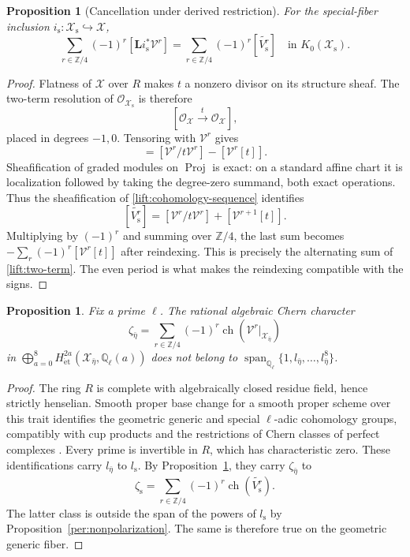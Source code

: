 \documentclass[11pt]{article}
\newtheorem{proposition}[theorem]{Proposition}
\theoremstyle{definition}
\theoremstyle{remark}
\newcommand{\Q}{\mathbb Q}
\newcommand{\Z}{\mathbb Z}
\DeclareMathOperator{\Proj}{Proj}
\DeclareMathOperator{\ch}{ch}
\newcommand{\cO}{\mathcal O}
\numberwithin{equation}{section}
\begin{document}
\begin{proposition}[Cancellation under derived restriction]
\label{lift:cancellation}
For the special-fiber inclusion $i_{\mathrm s}:\mathscr X_{\mathrm s}
\hookrightarrow\mathscr X$,
\begin{equation}
 \sum_{r\in\Z/4}(-1)^r
       [\mathbf L i_{\mathrm s}^*\mathcal V^r]
 =\sum_{r\in\Z/4}(-1)^r[\widetilde{V_{\mathrm s}^r}]
 \quad\text{in }K_0(\mathscr X_{\mathrm s}).
 \label{lift:derived-equality}
\end{equation}
\end{proposition}

\begin{proof}
Flatness of $\mathscr X$ over $R$ makes $t$ a nonzero divisor on its
structure sheaf.  The two-term resolution of
$\cO_{\mathscr X_{\mathrm s}}$ is therefore
\[
 [\cO_{\mathscr X}\xrightarrow{\ t\ }\cO_{\mathscr X}],
\]
placed in degrees $-1,0$.  Tensoring with $\mathcal V^r$ gives
\begin{equation}
 [\mathbf L i_{\mathrm s}^*\mathcal V^r]
   =[\mathcal V^r/t\mathcal V^r]-[\mathcal V^r[t]].
 \label{lift:two-term}
\end{equation}
Sheafification of graded modules on $\Proj$ is exact: on a standard
affine chart it is localization followed by taking the degree-zero
summand, both exact operations.  Thus the sheafification of
\eqref{lift:cohomology-sequence} identifies
\[
 [\widetilde{V_{\mathrm s}^r}]
  =[\mathcal V^r/t\mathcal V^r]+[\mathcal V^{r+1}[t]].
\]
Multiplying by $(-1)^r$ and summing over $\Z/4$, the last sum becomes
$-\sum_r(-1)^r[\mathcal V^r[t]]$ after reindexing.  This is precisely
the alternating sum of \eqref{lift:two-term}.  The even period is what
makes the reindexing compatible with the signs.
\end{proof}

\begin{proposition}
\label{lift:generic-character}
Fix a prime $\ell$.  The rational algebraic Chern character
\[
 \zeta_{\bar\eta}
   =\sum_{r\in\Z/4}(-1)^r
        \ch(\mathcal V^r|_{\mathscr X_{\bar\eta}})
\]
in $\bigoplus_{a=0}^8H^{2a}_{\mathrm{\acute et}}
(\mathscr X_{\bar\eta},\Q_\ell(a))$ does not belong to
$\operatorname{span}_{\Q_\ell}\{1,l_{\bar\eta},\ldots,l_{\bar\eta}^8\}$.
\end{proposition}

\begin{proof}
The ring $R$ is complete with algebraically closed residue field, hence
strictly henselian.  Smooth proper base change for a smooth proper scheme
over this trait identifies the geometric generic and special
$\ell$-adic cohomology groups, compatibly with cup products and the
restrictions of Chern classes of perfect complexes
\cite{smooth-proper}.  Every prime is invertible in $R$, which has
characteristic zero.  These identifications carry $l_{\bar\eta}$ to
$l_{\mathrm s}$.  By Proposition~\ref{lift:cancellation}, they carry
$\zeta_{\bar\eta}$ to
\[
 \zeta_{\mathrm s}
   =\sum_{r\in\Z/4}(-1)^r\ch(\widetilde{V_{\mathrm s}^r}).
\]
The latter class is outside the span of the powers of $l_{\mathrm s}$
by Proposition~\ref{per:nonpolarization}.  The same is therefore true
on the geometric generic fiber.
\end{proof}
\end{document}
